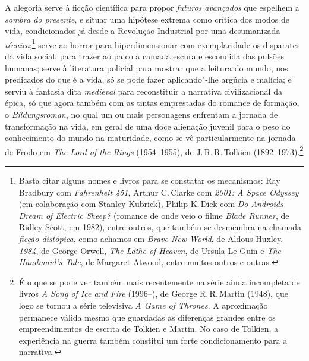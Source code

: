 A alegoria serve à ficção científica para propor \emph{futuros
avançados} que espelhem a \emph{sombra do presente}, e situar uma
hipótese extrema como crítica dos modos de vida, condicionados já desde
a Revolução Industrial por uma desumanizada \emph{técnica};\footnote{Basta
  citar alguns nomes e livros para se constatar os mecanismos: Ray
  Bradbury com \emph{Fahrenheit 451}, Arthur C.\,Clarke com \emph{2001: A
  Space Odyssey} (em colaboração com Stanley Kubrick), Philip K.\,Dick
  com \emph{Do Androids Dream of Electric Sheep?} (romance de onde veio
  o filme \emph{Blade Runner}, de Ridley Scott, em 1982), entre outros,
  que também se desmembra na chamada \emph{ficção distópica}, como
  achamos em \emph{Brave New World}, de Aldous Huxley, \emph{1984}, de
  George Orwell, \emph{The Lathe of Heaven}, de Ursula Le Guin e
  \emph{The Handmaid's Tale}, de Margaret Atwood, entre muitos outros e
  outras.} serve ao horror para hiperdimensionar com exemplaridade os
disparates da vida social, para trazer ao palco a camada escura e
escondida das pulsões humanas; serve à literatura policial para mostrar
que a leitura do mundo, nos predicados do que é a vida, só se pode fazer
aplicando"-lhe argúcia e malícia; e serviu à fantasia dita
\emph{medieval} para reconstituir a narrativa civilizacional da épica,
só que agora também com as tintas emprestadas do romance de formação, o
\emph{Bildungsroman}, no qual um ou mais personagens enfrentam a jornada
de transformação na vida, em geral de uma doce alienação juvenil para o
peso do conhecimento do mundo na maturidade, como se vê particularmente
na jornada de Frodo em \emph{The Lord of the Rings} (1954--1955), de J.\,R.\,R.\,Tolkien (1892--1973).\footnote{É o que se pode ver também mais
  recentemente na série ainda incompleta de livros \emph{A Song of Ice
  and Fire} (1996--), de George R.\,R.\,Martin (1948), que logo se tornou
  a série televisiva \emph{A Game of Thrones}. A aproximação permanece
  válida mesmo que guardadas as diferenças grandes entre os
  empreendimentos de escrita de Tolkien e Martin. No caso de Tolkien, a
  experiência na guerra também constitui um forte condicionamento para a
  narrativa.}

